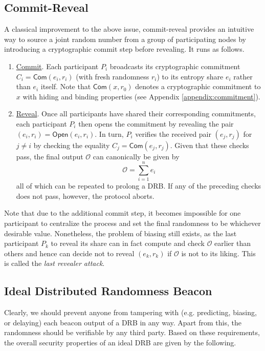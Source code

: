 \documentclass[letterpaper,twocolumn,10pt]{article}
\theoremstyle{definition}
\theoremstyle{remark}
\begin{document}
\subsection{Commit-Reveal}
\label{subsection:commit-reveal}
A classical improvement to the above issue, commit-reveal provides an intuitive way to source a joint random number from a group of participating nodes by introducing a cryptographic commit step before revealing. It runs as follows.
\begin{enumerate}
\item \underline{Commit}. Each participant $P_i$ broadcasts its cryptographic commitment $C_i = \mathsf{Com}(e_i, r_i)$ (with fresh randomness $r_i$) to its entropy share $e_i$ rather than $e_i$ itself. Note that $\mathsf{Com}(x, r_0)$ denotes a cryptographic commitment to $x$ with hiding and binding properties (see Appendix \ref{appendix:commitment}).
\item \underline{Reveal}. Once all participants have shared their corresponding commitments, each participant $P_i$ then opens the commitment by revealing the pair $(e_i, r_i) = \mathsf{Open}(e_i, r_i)$. In turn, $P_i$ verifies the received pair $(e_j, r_j)$ for $j \neq i$ by checking the equality $C_j = \mathsf{Com}(e_j, r_j)$. Given that these checks pass, the final output $\mathcal{O}$ can canonically be given by
\[
\mathcal{O} = \sum_{i = 1}^n e_i
\]
all of which can be repeated to prolong a DRB. If any of the preceding checks does not pass, however, the protocol aborts.
\end{enumerate}

Note that due to the additional commit step, it becomes impossible for one participant to centralize the process and set the final randomness to be whichever desirable value. Nonetheless, the problem of biasing still exists, as the last participant $P_k$ to reveal its share can in fact compute and check $\mathcal{O}$ earlier than others and hence can decide not to reveal $(e_k, r_k)$ if $\mathcal{O}$ is not to its liking. This is called the \textit{last revealer attack}.

\subsection{Ideal Distributed Randomness Beacon}
Clearly, we should prevent anyone from tampering with (e.g. predicting, biasing, or delaying) each beacon output of a DRB in any way. Apart from this, the randomness should be verifiable by any third party. Based on these requirements, the overall security properties of an ideal DRB are given by the following.
\end{document}
